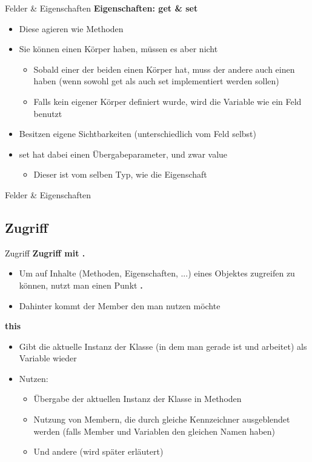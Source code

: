 \begin{frame}{Felder \& Eigenschaften}
	\textbf{Eigenschaften: get \& set}
	\begin{itemize}
		\item Diese agieren wie Methoden
		\item Sie können einen Körper haben, müssen es aber nicht
		\begin{itemize}
			\item Sobald einer der beiden einen Körper hat, muss der andere auch einen haben (wenn sowohl \alert{get} als auch \alert{set} implementiert werden sollen)
			\item Falls kein eigener Körper definiert wurde, wird die Variable wie ein Feld benutzt
		\end{itemize}
		\item Besitzen eigene Sichtbarkeiten (unterschiedlich vom Feld selbst)
		\item \alert{set} hat dabei einen Übergabeparameter, und zwar \alert{value}
		\begin{itemize}
			\item Dieser ist vom selben Typ, wie die Eigenschaft		
		\end{itemize}		
	\end{itemize}
\end{frame}

\begin{frame}{Felder \& Eigenschaften}	
	
\end{frame}

\subsection{Zugriff}
\begin{frame}{Zugriff}
	\textbf{Zugriff mit .}\\
	\begin{itemize}
		\item Um auf Inhalte (Methoden, Eigenschaften, ...) eines Objektes zugreifen zu können, nutzt man einen Punkt \alert{\textbf{.}}
		\item Dahinter kommt der Member den man nutzen möchte
	\end{itemize}
	\textbf{this}\\
	\begin{itemize}
		\item Gibt die aktuelle Instanz der Klasse (in dem man gerade ist und arbeitet) als Variable wieder
		\item Nutzen:
		\begin{itemize}
			\item Übergabe der aktuellen Instanz der Klasse in Methoden
			\item Nutzung von Membern, die durch gleiche Kennzeichner ausgeblendet werden (falls Member und Variablen den gleichen Namen haben)
			\item Und andere (wird später erläutert)
		\end{itemize}
	\end{itemize}
\end{frame}

